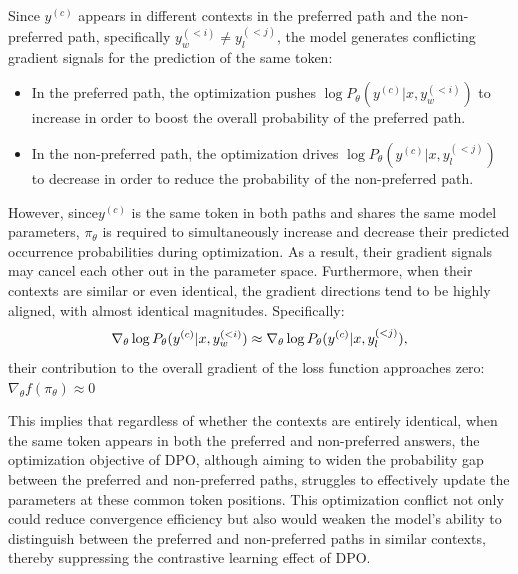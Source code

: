 Since $y^{(c)}$ appears in different contexts in the preferred path and the non-preferred path, specifically $y_w^{(<i)} \neq y_l^{(<j)}$, the model generates conflicting gradient signals for the prediction of the same token:
\begin{itemize}
    \item  In the preferred path, the optimization pushes $\log P_{\theta}(y^{(c)} | x, y_w^{(<i)})$ to increase in order to boost the overall probability of the preferred path.
    
    \item In the non-preferred path, the optimization drives $\log P_{\theta}(y^{(c)} | x, y_l^{(<j)})$ to decrease in order to reduce the probability of the non-preferred path.
\end{itemize}

However, since$ y^{(c)}$ is the same token in both paths and shares the same model parameters, $\pi_{\theta}$ is required to simultaneously increase and decrease their predicted occurrence probabilities during optimization. As a result, their gradient signals may cancel each other out in the parameter space. Furthermore, when their contexts are similar or even identical, the gradient directions tend to be highly aligned, with almost identical magnitudes. Specifically:
\begin{equation}
\small
\nabla_{\theta} \log P_{\theta}(y^{(c)} | x, y_w^{(<i)}) \approx \nabla_{\theta} \log P_{\theta}(y^{(c)} | x, y_l^{(<j)}),
\end{equation}
their contribution to the overall gradient of the loss function approaches zero:
$\nabla_{\theta} f(\pi_{\theta}) \approx 0$

This implies that regardless of whether the contexts are entirely identical, when the same token appears in both the preferred and non-preferred answers, the optimization objective of DPO, although aiming to widen the probability gap between the preferred and non-preferred paths, struggles to effectively update the parameters at these common token positions. This optimization conflict not only could reduce convergence efficiency but also would weaken the model’s ability to distinguish between the preferred and non-preferred paths in similar contexts, thereby suppressing the contrastive learning effect of DPO.

